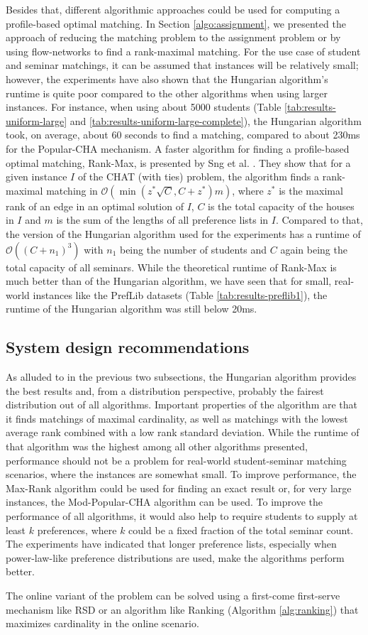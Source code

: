 Besides that, different algorithmic approaches could be used for computing a profile-based optimal matching. In Section \ref{algo:assignment}, we presented the approach of reducing the matching problem to the assignment problem or by using flow-networks to find a rank-maximal matching. For the use case of student and seminar matchings, it can be assumed that instances will be relatively small; however, the experiments have also shown that the Hungarian algorithm's runtime is quite poor compared to the other algorithms when using larger instances. For instance, when using about 5000 students (Table \ref{tab:results-uniform-large} and \ref{tab:results-uniform-large-complete}),
the Hungarian algorithm took, on average, about 60 seconds to find a matching, compared to about 230ms for the Popular-CHA mechanism. A faster algorithm for finding a profile-based optimal matching, Rank-Max, is presented by Sng et al. \cite{SngThesis}. They show that for a given instance $I$ of the CHAT (with ties) problem, the algorithm finds a rank-maximal matching in $\mathcal{O}(\min(z^*\sqrt{C}, C + z^*)m)$, where $z^*$ is the maximal rank of an edge in an optimal solution of $I$, $C$ is the total capacity of the houses in $I$ and $m$ is the sum of the lengths of all preference lists in $I$. Compared to that, the version of the Hungarian algorithm used for the experiments has a runtime of $\mathcal{O}((C+n_1)^3)$ with $n_1$ being the number of students and $C$ again being the total capacity of all seminars. While the theoretical runtime of Rank-Max is much better than of the Hungarian algorithm, we have seen that for small, real-world instances like the PrefLib datasets (Table \ref{tab:results-preflib1}), the runtime of the Hungarian algorithm was still below 20ms.

\subsection{System design recommendations}
As alluded to in the previous two subsections, the Hungarian algorithm provides the best results and, from a distribution perspective, probably the fairest distribution out of all algorithms. Important properties of the algorithm are that it finds matchings of maximal cardinality, as well as matchings with the lowest average rank combined with a low rank standard deviation. While the runtime of that algorithm was the highest among all other algorithms presented, performance should not be a problem for real-world student-seminar matching scenarios, where the instances are somewhat small. To improve performance, the Max-Rank algorithm \cite{SngThesis} could be used for finding an exact result or, for very large instances, the Mod-Popular-CHA algorithm can be used. To improve the performance of all algorithms, it would also help to require students to supply at least $k$ preferences, where $k$ could be a fixed fraction of the total seminar count. The experiments have indicated that longer preference lists, especially when power-law-like preference distributions are used, make the algorithms perform better.

The online variant of the problem can be solved using a first-come first-serve mechanism like RSD or an algorithm like Ranking (Algorithm \ref{alg:ranking}) that maximizes cardinality in the online scenario.
